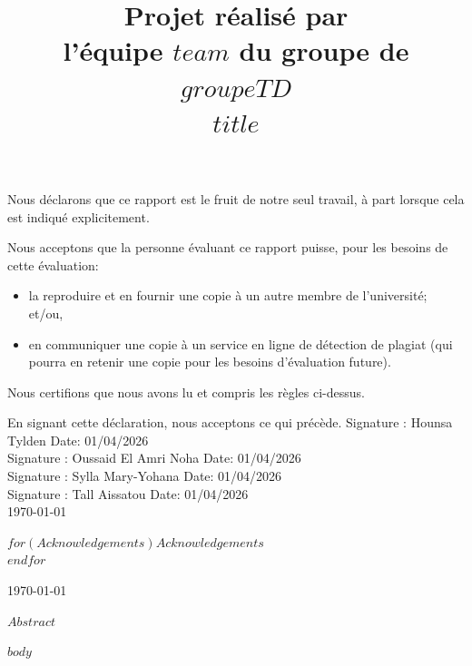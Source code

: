 \documentclass[mstat,12pt]{unswthesis}
\title{Projet réalisé par\\[0.5cm] l'équipe $team$ du groupe de $groupeTD$ \\[3cm]$title$}
\author{\Authornameonly}
\begin{document}
\beforepreface




\vskip 2pc \noindent Nous déclarons que ce rapport est le fruit de notre seul travail, à part lorsque cela est indiqué  explicitement. 

\vskip 2pc  \noindent Nous acceptons que la personne évaluant ce rapport puisse, pour les besoins de cette évaluation:
\begin{itemize}
\item la reproduire et en fournir une copie à un autre membre de l'université; et/ou,
\item en communiquer une copie à un service en ligne de détection de plagiat (qui pourra en retenir une copie pour les besoins d'évaluation future).
\end{itemize}

\vskip 2pc \noindent Nous certifions que nous avons lu et compris les règles ci-dessus.

\vskip 2pc \noindent En signant cette déclaration, nous acceptons ce qui précède.
\vskip 2pc \noindent
Signature : Hounsa Tylden \hfill Date: 01/04/2026\\[1cm]
Signature : Oussaid El Amri Noha \hfill Date: 01/04/2026 \\[1cm]
Signature : Sylla Mary-Yohana \hfill Date: 01/04/2026 \\[1cm]
Signature : Tall Aissatou \hfill Date: 01/04/2026 \\[1cm]



{\bigskip\bigskip\bigskip\noindent} \today




{\bigskip}$for(Acknowledgements)$$Acknowledgements$\\[1cm] $endfor$

{\bigskip\bigskip\bigskip\noindent} \today




$Abstract$



\afterpreface





%
%






$body$
\end{document}
